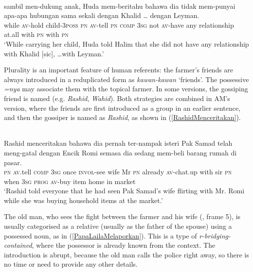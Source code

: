 \documentclass[output=paper
,modfonts
,nonflat]{langsci/langscibook}
\begin{document}
\ea\label{SambilMendukung} 
\\
	\gll sambil         men-dukung  {\ob}anak,     Huda        mem-beritahu        bahawa dia tidak mem-punyai apa-apa  hubungan     {sama sekali} dengan Khalid      {\ldots} dengan Leyman.\\
while \textsc{av-}hold      child-\textsc{3poss} \textsc{pn} \textsc{av-}tell     \textsc{pn} \textsc{comp}   \textsc{3sg} not   \textsc{av-}have any relationship at.all      with   \textsc{pn}       {}  with \textsc{pn}\\
\glt `While carrying her child, Huda told Halim that she did not have any relationship with Khalid [sic], \ldots with Leyman.'
\z

\noindent
Plurality is an important feature of human referents: the farmer's friends are always introduced in a reduplicated form as \emph{kawan-kawan} `friends'. The possessive \emph{=nya} may associate them with the topical farmer. In some versions, the gossiping friend is named (e.g. \emph{Rashid}, \emph{Wahid}). Both strategies are combined in AM's version, where the friends are first introduced as a group in an earlier sentence, and then the gossiper is named as \emph{Rashid}, as shown in (\ref{RashidMenceritakan}).


\ea\label{RashidMenceritakan}  
\\
	\gll  {\ob}Rashid{\cb}      menceritakan bahawa dia pernah ter-nampak isteri Pak Samad       telah   meng-gatal dengan Encik Romi       semasa dia sedang mem-beli barang rumah di pasar.\\
	\textsc{pn} \textsc{av}.tell         \textsc{comp}   \textsc{3sg} once   \textsc{invol-}see       wife   Mr  \textsc{pn} already \textsc{av-}chat.up   with   sir   \textsc{pn} when   \textsc{3sg} \textsc{prog}   \textsc{av-}buy     item   home  in market\\
	\glt `Rashid told everyone that he had seen Pak Samad's wife flirting with Mr.  Romi while she was buying household items at the market.' 
\z

\noindent
The old man, who sees the fight between the farmer and his wife (, frame 5), is usually categorised as a relative (usually as the father of the spouse) using a possessed noun, as in (\ref{PapaLailaMelaporkan}). This is a type of \emph{r-bridging-contained}, where the possessor is already known from the context. The introduction is abrupt, because the old man calls the police right away, so there is no time or need to provide any other details.
\end{document}
